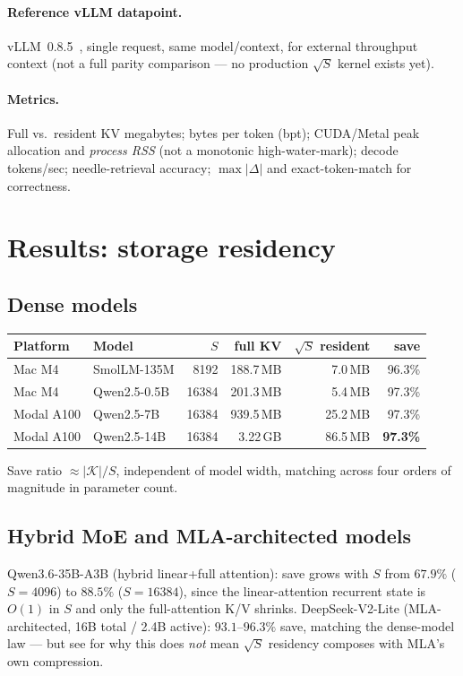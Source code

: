 \documentclass[11pt]{article}
\begin{document}
\paragraph{Reference vLLM datapoint.} vLLM~0.8.5~\cite{kwon2023vllm},
single request, same model/context, for external throughput context (not a
full parity comparison --- no production $\sqrt{S}$ kernel exists yet).

\paragraph{Metrics.} Full vs.\ resident KV megabytes; bytes per token
(bpt); CUDA/Metal peak allocation and \emph{process RSS} (not a
monotonic high-water-mark); decode tokens/sec; needle-retrieval accuracy;
$\max|\Delta|$ and exact-token-match for correctness.

\section{Results: storage residency}

\subsection{Dense models}
\begin{center}
\begin{tabular}{@{}llrrrr@{}}
\toprule
Platform & Model & $S$ & full KV & $\sqrt{S}$ resident & save \\
\midrule
Mac M4 & SmolLM-135M & 8192 & 188.7\,MB & 7.0\,MB & 96.3\% \\
Mac M4 & Qwen2.5-0.5B & 16384 & 201.3\,MB & 5.4\,MB & 97.3\% \\
Modal A100 & Qwen2.5-7B & 16384 & 939.5\,MB & 25.2\,MB & 97.3\% \\
Modal A100 & Qwen2.5-14B & 16384 & 3.22\,GB & 86.5\,MB & \textbf{97.3\%} \\
\bottomrule
\end{tabular}
\end{center}
Save ratio $\approx|\mathcal{K}|/S$, independent of model width, matching
across four orders of magnitude in parameter count.

\subsection{Hybrid MoE and MLA-architected models}
Qwen3.6-35B-A3B (hybrid linear+full attention): save grows with $S$ from
$67.9\%$ ($S{=}4096$) to $88.5\%$ ($S{=}16384$), since the linear-attention
recurrent state is $O(1)$ in $S$ and only the full-attention K/V shrinks.
DeepSeek-V2-Lite (MLA-architected, 16B total / 2.4B active): $93.1$--$96.3\%$
save, matching the dense-model law --- but see  for why this
does \emph{not} mean $\sqrt{S}$ residency composes with MLA's own
compression.
\end{document}
